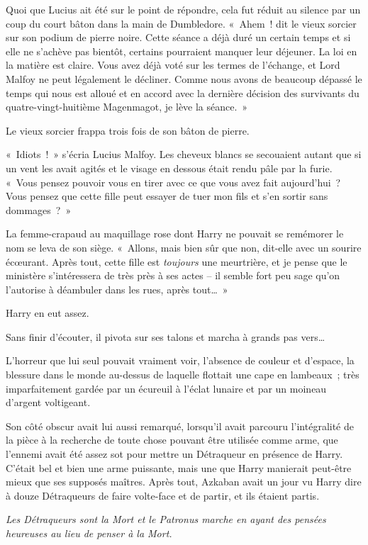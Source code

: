 Quoi que Lucius ait été sur le point de répondre, cela fut réduit au silence par un coup du court bâton dans la main de Dumbledore.
«~Ahem~! dit le vieux sorcier sur son podium de pierre noire.
Cette séance a déjà duré un certain temps et si elle ne s'achève pas bientôt, certains pourraient manquer leur déjeuner.
La loi en la matière est claire.
Vous avez déjà voté sur les termes de l'échange, et Lord Malfoy ne peut légalement le décliner.
Comme nous avons de beaucoup dépassé le temps qui nous est alloué et en accord avec la dernière décision des survivants du quatre-vingt-huitième Magenmagot, je lève la séance.~»

Le vieux sorcier frappa trois fois de son bâton de pierre.

«~Idiots~!~»
s'écria Lucius Malfoy.
Les cheveux blancs se secouaient autant que si un vent les avait agités et le visage en dessous était rendu pâle par la furie.
«~Vous pensez pouvoir vous en tirer avec ce que vous avez fait aujourd'hui~?
Vous pensez que cette fille peut essayer de tuer mon fils et s'en sortir sans dommages~?~»

La femme-crapaud au maquillage rose dont Harry ne pouvait se remémorer le nom se leva de son siège.
«~Allons, mais bien sûr que non, dit-elle avec un sourire écœurant.
Après tout, cette fille est \emph{toujours} une meurtrière, et je pense que le ministère s'intéressera de très près à ses actes -- il semble fort peu sage qu'on l'autorise à déambuler dans les rues, après tout…~»

Harry en eut assez.

Sans finir d'écouter, il pivota sur ses talons et marcha à grands pas vers…

L'horreur que lui seul pouvait vraiment voir, l'absence de couleur et d'espace, la blessure dans le monde au-dessus de laquelle flottait une cape en lambeaux~; très imparfaitement gardée par un écureuil à l'éclat lunaire et par un moineau d'argent voltigeant.

Son côté obscur avait lui aussi remarqué, lorsqu'il avait parcouru l'intégralité de la pièce à la recherche de toute chose pouvant être utilisée comme arme, que l'ennemi avait été assez sot pour mettre un Détraqueur en présence de Harry.
C'était bel et bien une arme puissante, mais une que Harry manierait peut-être mieux que ses supposés maîtres.
Après tout, Azkaban avait un jour vu Harry dire à douze Détraqueurs de faire volte-face et de partir, et ils étaient partis.

\emph{Les Détraqueurs sont la Mort et le Patronus marche en ayant des pensées heureuses au lieu de penser à la Mort.}

